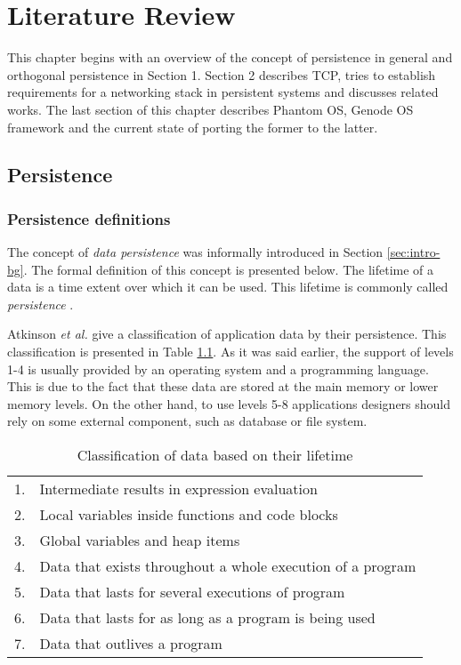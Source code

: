 \chapter{Literature Review}
\label{chap:lr}

This chapter begins with an overview of the concept of persistence in general
and orthogonal persistence in Section 1. Section 2 describes TCP, tries to
establish requirements for a networking stack in persistent systems and
discusses related works. The last section of this chapter describes Phantom OS,
Genode OS framework and the current state of porting the former to the latter.

\section{Persistence}
\subsection{Persistence definitions}

The concept of \textit{data persistence} was informally introduced in Section
\ref{sec:intro-bg}. The formal definition of this concept is presented below.
The lifetime of a data is a time extent over which it can be used. This
lifetime is commonly called \textit{persistence} \cite{atkinson1983ps}. 

Atkinson \textit{et al.} \cite{atkinson1995orthogonally,atkinson1983ps} give a
classification of application data by their persistence. This classification is
presented in Table \ref{tab:data_lifetimes}. As it was said earlier, the
support of levels 1-4 is usually provided by an operating system and a
programming language. This is due to the fact that these data are stored at the
main memory or lower memory levels.  On the other hand, to use levels 5-8
applications designers should rely on some external component, such as database
or file system. 

\begin{longtable}{cl}
\caption[Classification of data based on their lifetime]{Classification of data
based on their lifetime} 
\label{tab:data_lifetimes} \\
\hline
1. & Intermediate results in expression evaluation \\
2. & Local variables inside functions and code blocks \\
3. & Global variables and heap items \\
4. & Data that exists throughout a whole execution of a program \\
5. & Data that lasts for several executions of program \\
6. & Data that lasts for as long as a program is being used \\
7. & Data that outlives a program \\
\hline
\end{longtable}

